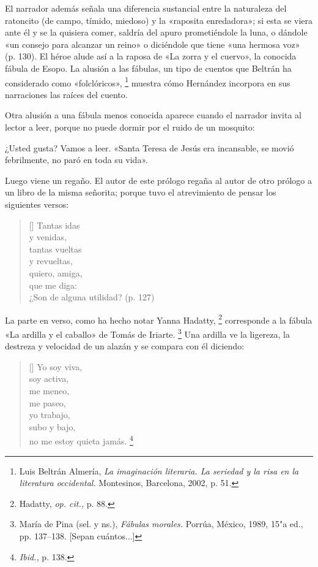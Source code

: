 \documentclass[14pt,twoside,final]{extbook} %
\let\oldfootnote\footnote
\renewcommand\footnote[1]{%
\oldfootnote{\hspace{1mm}#1}}
\begin{document}
El narrador además señala una diferencia sustancial entre la naturaleza del ratoncito (de campo, tímido, miedoso) y la «raposita enredadora»; si esta se viera ante él y se la quisiera comer, saldría del apuro prometiéndole la luna, o dándole «un consejo para alcanzar un reino» o diciéndole que tiene «una hermosa voz» (p. 130). El héroe alude así a la raposa de «La zorra y el cuervo», la conocida fábula de Esopo. La alusión a las fábulas, un tipo de cuentos que Beltrán ha considerado como «folclóricos»,\footnote{Luis Beltrán Almería, \emph{La imaginación literaria. La seriedad y la risa en la literatura occidental.} Montesinos, Barcelona, 2002, p. 51.} muestra cómo Hernández incorpora en sus narraciones las raíces del cuento.\protect\enlargethispage*{\baselineskip}

Otra alusión a una fábula menos conocida aparece cuando el narrador invita al lector a leer, porque no puede dormir por el ruido de un mosquito:
\begin{quoting}
¿Usted gusta? Vamos a leer. «Santa Teresa de Jesús era incansable, se movió febrilmente, no paró en toda su vida».

Luego viene un regaño. El autor de este prólogo regaña al autor de otro prólogo a un libro de la misma señorita; porque tuvo el atrevimiento de pensar los siguientes versos:
\settowidth{\versewidth}{¿Son de alguna utilidad? (p. 127)}
\begin{verse}[\versewidth]
Tantas idas \\
y venidas, \\
tantas vueltas \\
y revueltas, \\
quiero, amiga, \\
que me diga: \\
¿Son de alguna utilidad? (p. 127)
\end{verse}
\end{quoting}
La parte en verso, como ha hecho notar Yanna Hadatty,\footnote{Hadatty, \emph{op. cit.,} p. 88.} corresponde a la fábula «La ardilla y el caballo» de Tomás de Iriarte.\footnote{María de Pina (sel. y ns.), \emph{Fábulas morales.} Porrúa, México, 1989, 15"a ed., pp. 137--138. [Sepan cuántos...]} Una ardilla ve la ligereza, la destreza y velocidad de un alazán y se compara con él
diciendo:
\settowidth{\versewidth}{no me estoy quieta jamás.}
\begin{verse}[\versewidth]
Yo soy viva, \\
soy activa, \\
me meneo, \\
me paseo, \\
yo trabajo, \\
subo y bajo, \\
no me estoy quieta jamás.\footnote{\emph{Ibid.,} p. 138.}
\end{verse}
\end{document}
